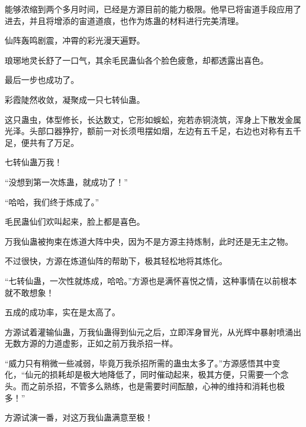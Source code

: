 \begin{this_body}
能够浓缩到两个多月时间，已经是方源目前的能力极限。他早已将宙道手段应用了进去，并且将增添的宙道道痕，也作为炼蛊的材料进行完美清理。

仙阵轰鸣剧震，冲霄的彩光漫天遍野。

琅琊地灵长舒了一口气，其余毛民蛊仙各个脸色疲惫，却都透露出喜色。

最后一步也成功了。

彩霞陡然收敛，凝聚成一只七转仙蛊。

这只蛊虫，体型修长，长达数丈，它形如蜈蚣，宛若赤铜浇筑，浑身上下散发金属光泽。头部口器狰狞，额前一对长须甩摆如烟，左边有五千足，右边也对称有五千足，便共有了万足。

七转仙蛊万我！

“没想到第一次炼蛊，就成功了！”

“哈哈，我们终于炼成了。”

毛民蛊仙们欢叫起来，脸上都是喜色。

万我仙蛊被拘束在炼道大阵中央，因为不是方源主持炼制，此时还是无主之物。

不过很快，方源在炼道仙阵的帮助下，极其轻松地将其炼化。

“七转仙蛊，一次性就炼成，哈哈。”方源也是满怀喜悦之情，这种事情在以前根本就不敢想象！

五成的成功率，实在是太高了。

方源试着灌输仙蛊，万我仙蛊得到仙元之后，立即浑身冒光，从光辉中暴射喷涌出无数方源的力道虚影，正如之前万我杀招一样。

“威力只有稍微一些减弱，毕竟万我杀招所需的蛊虫太多了。”方源感悟其中变化，“仙元的损耗却是极大地降低了，同时催动起来，极其方便，只需要一个念头。而之前杀招，不管多么熟练，也是需要时间酝酿，心神的维持和消耗也极多！”

方源试演一番，对这万我仙蛊满意至极！

\end{this_body}

